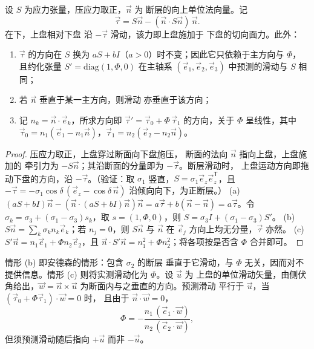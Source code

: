 \begin{theorem}[平面上的滑动方向]\label{thm:b3:structural-analysis:wallace-bott}
设 $S$ 为应力张量，压应力取正，$\vec n$ 为
断层的向上单位法向量。记
\[
  \vec\tau = S\vec n - (\vec n\cdot S\vec n)\,\vec n .
\]
在下，上盘相对下盘
沿 $-\vec\tau$ 滑动，该力即上盘施加于
下盘的切向面力。此外：
\begin{enumerate}[label=(\alph*)]
  \item $\vec\tau$ 的方向在 $S$ 换为 $aS +
        bI$（$a > 0$）时不变；因此它只依赖于主方向与 $\Phi$，
        且约化张量 $S' =
        \mathrm{diag}(1, \Phi, 0)$ 在主轴系 $(\vec e_1, \vec
        e_2, \vec e_3)$ 中预测的滑动与 $S$ 相同；
  \item 若 $\vec n$ 垂直于某一主方向，则滑动
        亦垂直于该方向；
  \item 记 $n_k = \vec n\cdot\vec e_k$，所求方向即 $\vec\tau'
        = \vec\tau_0 + \Phi\,\vec\tau_1$ 的方向，关于 $\Phi$ 呈线性，其中 $\vec\tau_0
        = n_1(\vec e_1 - n_1\vec n)$，$\vec\tau_1 = n_2(\vec e_2 - n_2\vec
        n)$。
\end{enumerate}
\end{theorem}

\begin{proof}
压应力取正，上盘穿过断面向下盘施压，
断面的法向 $\vec n$ 指向上盘，上盘施加的
牵引力为 $-S\vec n$；其沿断面的分量即为 $-\vec\tau$。断层滑动时，
上盘运动方向即拖动下盘的方向，沿
$-\vec\tau$。（验证：取 $\sigma_1$ 竖直，$S = \sigma_1\vec e_z\vec
e_z^{\mathsf T}$，且 $-\vec\tau = -\sigma_1\cos\delta\,(\vec e_z -
\cos\delta\,\vec n)$ 沿倾向向下，为正断层。）
(a) $(aS + bI)\vec n - (\vec n\cdot(aS + bI)\vec n)\vec n = a\vec\tau + b(\vec
n - \vec n) = a\vec\tau$。令 $\sigma_k = \sigma_3 + (\sigma_1 -
\sigma_3)s_k$，取 $s = (1, \Phi, 0)$，则 $S = \sigma_3 I + (\sigma_1 -
\sigma_3)S'$。
(b) $S\vec n = \sum_k\sigma_kn_k\vec e_k$；若 $n_j = 0$，则 $S\vec n$
与 $\vec n$ 在 $\vec e_j$ 方向上均无分量，$\vec\tau$ 亦然。
(c) $S'\vec n = n_1\vec e_1 + \Phi n_2\vec e_2$，且 $\vec n\cdot S'\vec n =
n_1^2 + \Phi n_2^2$；将各项按是否含 $\Phi$ 合并即可。
\end{proof}

情形 (b) 即安德森的情形：包含 $\sigma_2$ 的断层
垂直于它滑动，与 $\Phi$ 无关，因而对不提供信息。情形 (c) 则将实测滑动化为 $\Phi$。设 $\vec u$ 为
上盘的单位滑动矢量，由侧伏角给出，$\vec w = \vec n\times\vec
u$ 为断面内与之垂直的方向。预测滑动
平行于 $\vec u$，当 $(\vec\tau_0 + \Phi\vec\tau_1)\cdot\vec w = 0$ 时，
且由于 $\vec n\cdot\vec w = 0$，
\[
  \Phi = -\frac{n_1\,(\vec e_1\cdot\vec w)}{n_2\,(\vec e_2\cdot\vec w)} ,
\]
但须预测滑动随后指向 $+\vec u$ 而非 $-\vec u$。

